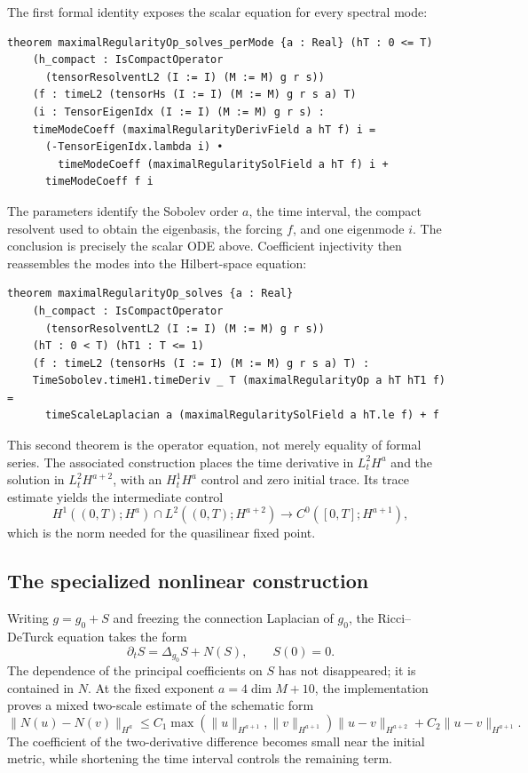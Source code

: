 \documentclass[11pt]{article}
\theoremstyle{plain}
\theoremstyle{definition}
\theoremstyle{remark}
\begin{document}
The first formal identity exposes the scalar equation for every spectral
mode:

\begin{Verbatim}[breaklines=true,breakanywhere=true,fontsize=\small]
theorem maximalRegularityOp_solves_perMode {a : Real} (hT : 0 <= T)
    (h_compact : IsCompactOperator
      (tensorResolventL2 (I := I) (M := M) g r s))
    (f : timeL2 (tensorHs (I := I) (M := M) g r s a) T)
    (i : TensorEigenIdx (I := I) (M := M) g r s) :
    timeModeCoeff (maximalRegularityDerivField a hT f) i =
      (-TensorEigenIdx.lambda i) •
        timeModeCoeff (maximalRegularitySolField a hT f) i +
      timeModeCoeff f i
\end{Verbatim}

The parameters identify the Sobolev order $a$, the time interval, the compact
resolvent used to obtain the eigenbasis, the forcing $f$, and one eigenmode
$i$.  The conclusion is precisely the scalar ODE above.  Coefficient
injectivity then reassembles the modes into the Hilbert-space equation:

\begin{Verbatim}[breaklines=true,breakanywhere=true,fontsize=\small]
theorem maximalRegularityOp_solves {a : Real}
    (h_compact : IsCompactOperator
      (tensorResolventL2 (I := I) (M := M) g r s))
    (hT : 0 < T) (hT1 : T <= 1)
    (f : timeL2 (tensorHs (I := I) (M := M) g r s a) T) :
    TimeSobolev.timeH1.timeDeriv _ T (maximalRegularityOp a hT hT1 f) =
      timeScaleLaplacian a (maximalRegularitySolField a hT.le f) + f
\end{Verbatim}

This second theorem is the operator equation, not merely equality of formal
series.  The associated construction places the time derivative in
$L^2_tH^a$ and the solution in $L^2_tH^{a+2}$, with an $H^1_tH^a$ control and
zero initial trace.  Its trace estimate yields the intermediate control
\[
  H^1((0,T);H^a)\cap L^2((0,T);H^{a+2})
  \longrightarrow C^0([0,T];H^{a+1}),
\]
which is the norm needed for the quasilinear fixed point.

\subsection{The specialized nonlinear construction}
\label{subsec:short-time-nonlinear}

Writing $g=g_0+S$ and freezing the connection Laplacian of $g_0$, the
Ricci--DeTurck equation takes the form
\[
  \partial_tS=\Delta_{g_0}S+N(S),\qquad S(0)=0.
\]
The dependence of the principal coefficients on $S$ has not disappeared; it
is contained in $N$.  At the fixed exponent
$a=4\dim M+10$, the implementation proves a mixed two-scale estimate of the
schematic form
\[
 \|N(u)-N(v)\|_{H^a}
 \le C_1\max(\|u\|_{H^{a+1}},\|v\|_{H^{a+1}})
          \|u-v\|_{H^{a+2}}
     +C_2\|u-v\|_{H^{a+1}}.
\]
The coefficient of the two-derivative difference becomes small near the
initial metric, while shortening the time interval controls the remaining
term.
\end{document}
